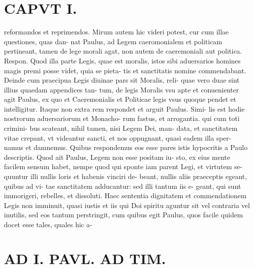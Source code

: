 \documentclass{article}
\begin{document}
\begin{pages}
\section*{CAPVT   I. }
\marginpar{[ p.21 ]}\pstart reformandos et reprimendos. Mirum autem hic videri potest, cur cum illae questiones, quas dan- nat Paulus, ad Legem caeromonialem et politicam pertineant, tamen de lege morali agat, non autem de caeremoniali aut politica. Respon. Quod illa parte Legis, quae est moralis, istos sibi aduersarios homines magis premi posse videt, quia se pieta- tis et sanctitatis nomine commendabant. Deinde cum praecipua Legis diuinae pars sit Moralis, reli- quae vero duae sint illius quaedam appendices tan- tum, de legis Moralis vsu apte et conuenienter agit Paulus, ex quo et Caeremonialis et Politicae legis vsus quoque pendet et intelligitur. Itaque non extra rem respondet et arguit Paulus. Simi- lis est hodie nostrorum aduersariorum et Monacho- rum fastus, et arrogantia. qui cum toti crimini- bus scateant, nihil tamen, nisi Legem Dei, man- data, et sanctitatem vitae crepant, vt videantur sancti, et nos oppugnant, quasi eadem illa sper- namus et damnemus. Quibus respondemus eos esse pares istis hypocritis a Paulo descriptis. Quod ait Paulus, Legem non esse positam iu- sto, ex eius mente facilem sensum habet, nempe quod qui sponte iam parent Legi, et virtutem se- quuntur illi nullis loris et habenis vinciri de- beant, nullis aliis praeceptis egeant, quibus ad vi- tae sanctitatem adducantur: sed illi tantum iis e- geant, qui sunt immorigeri, rebelles, et dissoluti. Haec sententia dignitatem et commendationem Legis non imminuit, quasi iustis et iis qui Doi spiritu aguntur sit vel contraria vel inutilis, sed eos tantum perstringit, cum quibus egit Paulus, quos facile quidem docet esse tales, quales hic a-  \pend
\section*{AD I. PAVL. AD TIM. }
\marginpar{[ p.22 ]}\pstart {}
{}

\end{pages}
\end{document}
